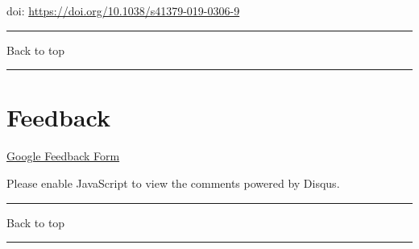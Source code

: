 \documentclass[
]{article}
\renewcommand{\linethickness}{0.05em}
\begin{document}
doi: \url{https://doi.org/10.1038/s41379-019-0306-9}

\begin{center}\rule{0.5\linewidth}{\linethickness}\end{center}

Back to top

\begin{center}\rule{0.5\linewidth}{\linethickness}\end{center}

\pagebreak

\hypertarget{feedback}{%
\section{Feedback}\label{feedback}}

\href{https://docs.google.com/forms/d/e/1FAIpQLSeD3Z9J6Y7eMmiyM12f_SfAmHUlykb1zxZcwO6lg7cebGYQIQ/viewform}{Google
Feedback Form}

\hypertarget{disqus_thread}{}

Please enable JavaScript to view the comments powered by Disqus.

\begin{center}\rule{0.5\linewidth}{\linethickness}\end{center}

Back to top

\begin{center}\rule{0.5\linewidth}{\linethickness}\end{center}

\pagebreak
\end{document}
